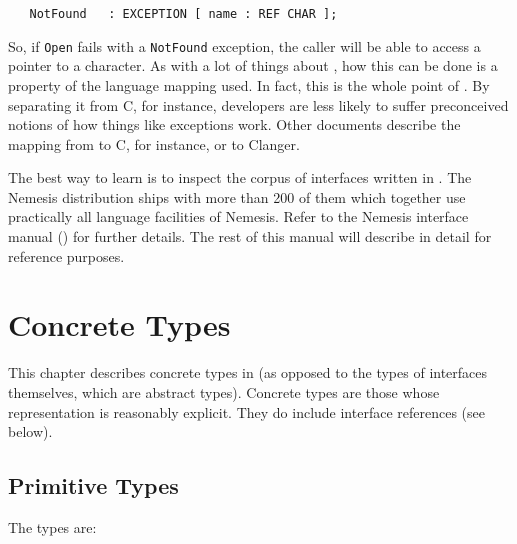 \begin{verbatim}
   NotFound   : EXCEPTION [ name : REF CHAR ];
\end{verbatim}

So, if {\tt Open} fails with a {\tt NotFound} exception, the caller
will be able to access a pointer to a character. As with a lot of
things about \MIDDL{}, how this can be done is a property of the language
mapping used. In fact, this is the whole point of \MIDDL{}. By separating
it from C, for instance, developers are less likely to suffer
preconceived notions of how things like exceptions work. Other
documents describe the mapping from \MIDDL{} to C, for instance, or to
Clanger.

The best way to learn \MIDDL{} is to inspect the corpus of interfaces
written in \MIDDL{}. The Nemesis distribution ships with more than 200
of them which together use practically all language facilities of
Nemesis. Refer to the Nemesis interface manual (\cite{XXX}) for
further details. The rest of this manual will describe \MIDDL{} in
detail for reference purposes.

\chapter{Concrete Types}

This chapter describes concrete types in \MIDDL{} (as opposed
to the types of interfaces themselves, which are abstract types).
Concrete types are those whose representation is reasonably explicit.
They do include interface references (see below).

\section{Primitive Types}


The types are:

